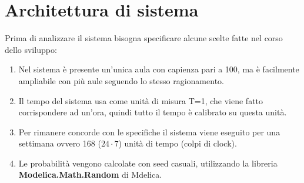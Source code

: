 \chapter*{Architettura di sistema}

\par Prima di analizzare il sistema bisogna specificare alcune scelte fatte nel corso dello sviluppo:
\begin{enumerate}
\item Nel sistema  è presente un’unica aula con capienza pari a 100, ma è facilmente ampliabile con più aule seguendo lo stesso ragionamento.
\item Il tempo del sistema usa come unità  di misura T=1, che viene fatto corrispondere ad un’ora, quindi tutto il tempo è calibrato su questa unità.
\item Per rimanere concorde con le specifiche il sistema viene eseguito per una settimana ovvero 168 (${24}\cdot{7}$) unità di tempo (colpi di clock).
\item Le probabilità vengono calcolate con seed casuali, utilizzando la libreria \textbf{Modelica.Math.Random} di Mdelica.
\end{enumerate}

